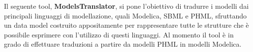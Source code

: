 
Il seguente tool, \textbf{ModelsTranslator}, si pone l'obiettivo di tradurre i modelli dai principali linguaggi di modellazione, quali Modelica, SBML e PHML, sfruttando un data model costruito appositamente per rappresentare tutte le strutture che è possibile esprimere con l'utilizzo di questi linguaggi. Al momento il tool è in grado di effettuare traduzioni a partire da modelli PHML in modelli Modelica.

